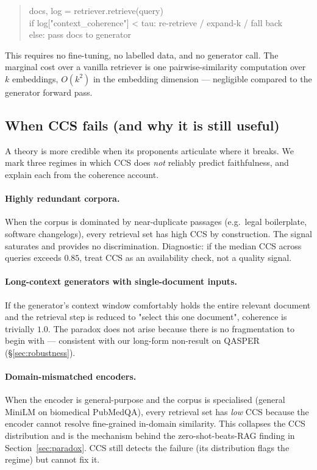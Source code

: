 \begin{quote}\small\ttfamily
docs, log = retriever.retrieve(query)\\
if log["context\_coherence"] < tau: re-retrieve / expand-k / fall back\\
else: pass docs to generator
\end{quote}

\noindent
This requires no fine-tuning, no labelled data, and no generator call.
The marginal cost over a vanilla retriever is one pairwise-similarity
computation over $k$ embeddings, $O(k^2)$ in the embedding dimension
--- negligible compared to the generator forward pass.

\subsection{When CCS fails (and why it is still useful)}
\label{sec:ccs_fails}

A theory is more credible when its proponents articulate where it
breaks. We mark three regimes in which CCS does \emph{not} reliably
predict faithfulness, and explain each from the coherence account.

\paragraph{Highly redundant corpora.}
When the corpus is dominated by near-duplicate passages (e.g.\ legal
boilerplate, software changelogs), every retrieval set has high CCS
by construction. The signal saturates and provides no discrimination.
Diagnostic: if the median CCS across queries exceeds $0.85$, treat
CCS as an availability check, not a quality signal.

\paragraph{Long-context generators with single-document inputs.}
If the generator's context window comfortably holds the entire
relevant document and the retrieval step is reduced to "select this
one document", coherence is trivially $1.0$. The paradox does not
arise because there is no fragmentation to begin with --- consistent
with our long-form non-result on QASPER (\S\ref{sec:robustness}).

\paragraph{Domain-mismatched encoders.}
When the encoder is general-purpose and the corpus is specialised
(general MiniLM on biomedical PubMedQA), every retrieval set has
\emph{low} CCS because the encoder cannot resolve fine-grained
in-domain similarity. This collapses the CCS distribution and is the
mechanism behind the zero-shot-beats-RAG finding in
Section~\ref{sec:paradox}. CCS still detects the failure (its
distribution flags the regime) but cannot fix it.

